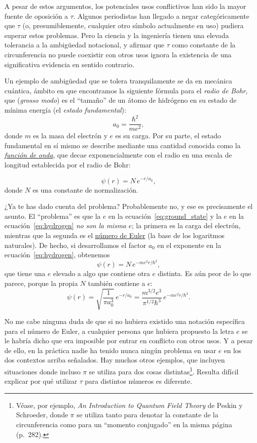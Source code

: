 A pesar de estos argumentos, los potenciales usos conflictivos han sido la mayor fuente de oposición a $\tau$. Algunos periodistas han llegado a negar categóricamente que $\tau$ (o, presumiblemente, cualquier otro símbolo actualmente en uso) pudiera superar estos problemas. Pero la ciencia y la ingeniería tienen una elevada tolerancia a la ambigüedad notacional, y afirmar que $\tau$ como constante de la circunferencia no puede coexistir con otros usos ignora la existencia de una significativa evidencia en sentido contrario.

Un ejemplo de  ambigüedad que se tolera tranquilamente se da en mecánica cuántica, ámbito en que encontramos la siguiente fórmula para el  \emph{radio de Bohr}, que (\textit{grosso modo}) es el ``tamaño'' de un átomo de hidrógeno en su estado de mínima energía (el \emph{estado fundamental}):
\begin{equation}
\label{eq:ground_state}
a_0 = \frac{\hbar^2}{m e^2},
\end{equation}
donde $m$ es la masa del electrón y $e$ es su carga. Por su parte, el estado fundamental en sí mismo se describe mediante una cantidad conocida como la \href{https://es.wikipedia.org/wiki/Función_de_onda}{\emph{función de onda}}, que decae exponencialmente con el radio en una escala de longitud establecida por el radio de Bohr:

\begin{equation}
\label{eq:hydrogen}
\psi(r) = N\,e^{-r/a_0},
\end{equation}
donde $N$ es una constante de normalización.

¿Ya te has dado cuenta del problema? Probablemente no, y ese es precisamente el asunto. El ``problema'' es que la $e$ en la ecuación~\eqref{eq:ground_state} y la $e$ en la ecuación~\eqref{eq:hydrogen} \emph{no son la misma $e$}; la primera es la carga del electrón, mientras que la segunda es el \href{https://es.wikipedia.org/wiki/N%C3%BAmero_e}{número de Euler} (la base de los logaritmos naturales). De hecho, si desarrollamos el factor $a_0$ en el exponente en la ecuación~\eqref{eq:hydrogen}, obtenemos
\[
\psi(r) = N\,e^{-m e^2 r/\hbar^2},
\]
que tiene una $e$ elevado a algo que contiene otra $e$ distinta. Es aún peor de lo que parece, porque la propia $N$ también contiene a $e$:
\[
\psi(r) = \sqrt{\frac{1}{\pi a_0^3}}\,e^{-r/a_0} =\frac{m^{3/2} e^3}{\pi^{1/2} \hbar^3}\,e^{-m e^2 r/\hbar^2}.
\]

No me cabe ninguna duda de que si no hubiera existido una notación específica para el número de Euler, a cualquier persona que hubiera propuesto la letra $e$ se le habría dicho que era imposible por entrar en conflicto con otros usos. Y a pesar de ello, en la práctica nadie ha tenido nunca ningún problema en usar $e$ en los dos contextos arriba señalados. Hay muchos otros ejemplos, que incluyen situaciones donde incluso $\pi$ se utiliza para dos cosas distintas\footnote{Véase, por ejemplo, \emph{An Introduction to Quantum Field Theory} de Peskin y Schroeder, donde $\pi$ se utiliza tanto para denotar la constante de la circunferencia como para un ``momento conjugado'' en la misma página (p.~282).}. Resulta difícil explicar por qué utilizar $\tau$ para distintos números es diferente.

